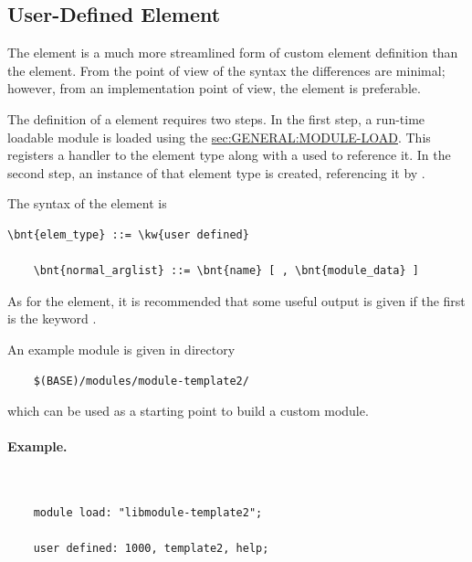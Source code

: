 \subsection{User-Defined Element}
The  element is a much more streamlined form
of custom element definition than the  element.
From the point of view of the syntax the differences are minimal;
however, from an implementation point of view, the 
element is preferable.

The definition of a  element requires two steps.
In the first step, a run-time loadable module is loaded using the 
\hyperref{\kw{module load} directive}{\kw{module load} directive (see Section~}{)}{sec:GENERAL:MODULE-LOAD}.
This registers a handler to the  element type
along with a  used to reference it.
In the second step, an instance of that  element type
is created, referencing it by .

The syntax of the  element is
\begin{Verbatim}[commandchars=\\\{\}]
    \bnt{elem_type} ::= \kw{user defined}

    \bnt{normal_arglist} ::= \bnt{name} [ , \bnt{module_data} ]
\end{Verbatim}
As for the  element, it is recommended that 
some useful output is given if the first 
is the keyword .

An example module is given in directory
\begin{verbatim}
    $(BASE)/modules/module-template2/
\end{verbatim}
which can be used as a starting point to build a custom module.

\paragraph{Example.} \
\begin{verbatim}
    module load: "libmodule-template2";

    user defined: 1000, template2, help;
\end{verbatim}



